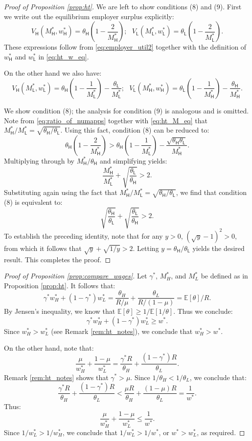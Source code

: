 \documentclass[11pt]{article}
\renewcommand{\H}{\ensuremath{\mathsf{H}}}
\renewcommand{\L}{\ensuremath{\mathsf{L}}}
\newcommand{\E}{\ensuremath{\mathbb{E}}}
\begin{document}
\begin{proof}[Proof of Proposition \ref{prop:ht}]
We are left to show conditions (8) and (9).
First we write out the equilibrium employer surplus explicitly:
\[ V_\H(M_\H^*, w_\H^*) = \theta_\H \left( 1 - \frac{2}{M_\H^*}\right);\ \ \ V_\L(M_\L^*, w_\L^*) = \theta_\L\left( 1 - \frac{2}{M_\L^*}\right). \]
These expressions follow from \eqref{eq:employer_util2}  together with the definition of $w_\H^*$ and $w_\L^*$ in \eqref{eq:ht_w_eq}.

On the other hand we also have:
\[ V_\H(M_\L^*, w_\L^*) = \theta_\H \left( 1 - \frac{1}{M_\L^*}\right) - \frac{\theta_\L}{M_\L^*};\ \ \ V_\L(M_\H^*, w_\H^*) = \theta_\L\left( 1 - \frac{1}{M_\H^*}\right) - \frac{\theta_\H}{M_\H^*}. \]

We show condition (8); the analysis for condition (9) is analogous and is omitted.
Note from \eqref{eq:ratio_of_numapps} together with \eqref{eq:ht_M_eq} that $M_\H^*/M_\L^* = \sqrt{\theta_\H/\theta_\L}$.
Using this fact, condition (8) can be reduced to:
\[ \theta_\H \left( 1 - \frac{2}{M_\H^*}\right) > \theta_\H \left( 1 - \frac{1}{M_\L^*}\right) - \frac{\sqrt{\theta_\H \theta_\L}}{M_\H^*}. \]
Multiplying through by $M_\H^*/\theta_\H$ and simplifying yields:
\[ \frac{M_\H^*}{M_\L^*} + \sqrt{\frac{\theta_\L}{\theta_\H}} > 2. \]
Substituting again using the fact that $M_\H^*/M_\L^* = \sqrt{\theta_\H/\theta_\L}$, we find that condition (8) is equivalent to:
\[ \sqrt{\frac{\theta_\H}{\theta_\L}} + \sqrt{\frac{\theta_\L}{\theta_\H}} > 2. \]
To establish the preceding identity, note that for any $y > 0$, $(\sqrt{y} - 1)^2 > 0$, from which it follows that $\sqrt{y} + \sqrt{1/y} > 2$.
Letting $y = \theta_\H/\theta_\L$ yields the desired result.
This completes the proof.
\end{proof}

\begin{proof}[Proof of Proposition \ref{prop:compare_wages}]
Let $\gamma^*$, $M_H^*$, and $M_L^*$ be defined as in Proposition \ref{prop:ht}.
It follows that:
\[ \gamma^* w_H^* + (1- \gamma^*) w_L^* = \frac{\theta_H}{R/\mu} + \frac{\theta_L}{R/(1-\mu)} = \E[\theta]/R. \]
By Jensen's inequality, we know that $\E[\theta] \geq 1/\E[1/\theta]$.
Thus we conclude:
\[ \gamma^* w_H^* + (1- \gamma^*) w_L^* \geq w^*. \]
Since $w_H^* > w_L^*$ (see Remark \ref{rem:ht_notes}), we conclude that $w_H^* > w^*$.

On the other hand, note that:
\[ \frac{\mu}{w_H^*} + \frac{1-\mu}{w_L^*} = \frac{\gamma^*R}{\theta_H} + \frac{(1-\gamma^*)R}{\theta_L}. \]
Remark \ref{rem:ht_notes} shows that $\gamma^* > \mu$.
Since $1/\theta_H < 1/\theta_L$, we conclude that:
\[ \frac{\gamma^*R}{\theta_H} + \frac{(1-\gamma^*)R}{\theta_L} < \frac{\mu R}{\theta_H} + \frac{(1-\mu)R}{\theta_L} = \frac{1}{w^*}. \]
Thus:
\[ \frac{\mu}{w_H^*} + \frac{1-\mu}{w_L^*} \leq \frac{1}{w^*}.\]
Since $1/w_L^* > 1/w_H^*$, we conclude that $1/w_L^* > 1/w^*$, or $w^* > w_L^*$, as required.
\end{proof}
\end{document}
